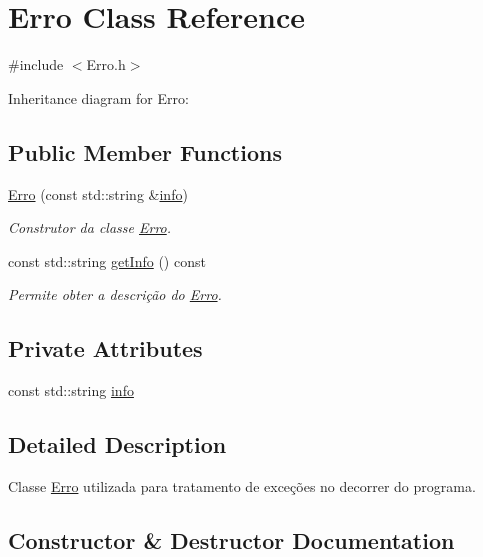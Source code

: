 \hypertarget{class_erro}{}\section{Erro Class Reference}
\label{class_erro}


{\ttfamily \#include $<$Erro.\+h$>$}



Inheritance diagram for Erro\+:
\subsection*{Public Member Functions}
\begin{DoxyCompactItemize}
\item 
\mbox{\hyperlink{class_erro_a15d79796bd17517ff05d45eee55556f1}{Erro}} (const std\+::string \&\mbox{\hyperlink{class_erro_a3ecaaf6f8e15a0830a648035b456cb62}{info}})
\begin{DoxyCompactList}\small\item\em Construtor da classe \mbox{\hyperlink{class_erro}{Erro}}. \end{DoxyCompactList}\item 
const std\+::string \mbox{\hyperlink{class_erro_abfc1e9735b259d88bb97828a23164eb0}{get\+Info}} () const
\begin{DoxyCompactList}\small\item\em Permite obter a descrição do \mbox{\hyperlink{class_erro}{Erro}}. \end{DoxyCompactList}\end{DoxyCompactItemize}
\subsection*{Private Attributes}
\begin{DoxyCompactItemize}
\item 
const std\+::string \mbox{\hyperlink{class_erro_a3ecaaf6f8e15a0830a648035b456cb62}{info}}
\end{DoxyCompactItemize}


\subsection{Detailed Description}
Classe \mbox{\hyperlink{class_erro}{Erro}} utilizada para tratamento de exceções no decorrer do programa. 

\subsection{Constructor \& Destructor Documentation}
\mbox{\label{class_erro_a15d79796bd17517ff05d45eee55556f1}} 
